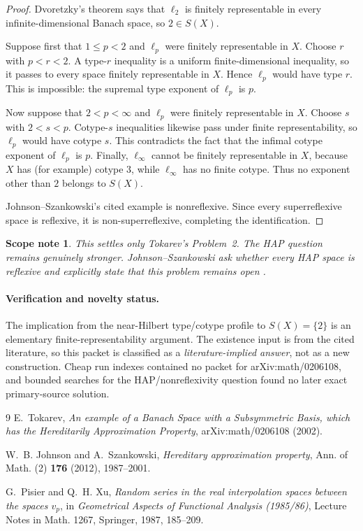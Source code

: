 \documentclass[11pt]{article}
\newtheorem{remark}{Scope note}
\begin{document}
\begin{proof}
Dvoretzky's theorem says that $\ell_2$ is finitely representable in every
infinite-dimensional Banach space, so $2\in S(X)$.

Suppose first that $1\le p<2$ and $\ell_p$ were finitely representable in
$X$.  Choose $r$ with $p<r<2$.  A type-$r$ inequality is a uniform
finite-dimensional inequality, so it passes to every space finitely
representable in $X$.  Hence $\ell_p$ would have type $r$.  This is
impossible: the supremal type exponent of $\ell_p$ is $p$.

Now suppose that $2<p<\infty$ and $\ell_p$ were finitely representable in
$X$.  Choose $s$ with $2<s<p$.  Cotype-$s$ inequalities likewise pass under
finite representability, so $\ell_p$ would have cotype $s$.  This contradicts
the fact that the infimal cotype exponent of $\ell_p$ is $p$.  Finally,
$\ell_\infty$ cannot be finitely representable in $X$, because $X$ has (for
example) cotype $3$, while $\ell_\infty$ has no finite cotype.  Thus no
exponent other than $2$ belongs to $S(X)$.

Johnson--Szankowski's cited example is nonreflexive.  Since every
superreflexive space is reflexive, it is non-superreflexive, completing the
identification.
\end{proof}

\begin{remark}
This settles only Tokarev's Problem~2.  The HAP question remains genuinely
stronger.  Johnson--Szankowski ask whether every HAP space is reflexive and
explicitly state that this problem remains open \cite[p.~1988]{JS}.
\end{remark}

\paragraph{Verification and novelty status.}
The implication from the near-Hilbert type/cotype profile to $S(X)=\{2\}$ is
an elementary finite-representability argument.  The existence input is from
the cited literature, so this packet is classified as a
\emph{literature-implied answer}, not as a new construction.  Cheap run
indexes contained no packet for arXiv:math/0206108, and bounded searches for
the HAP/nonreflexivity question found no later exact primary-source solution.

\begin{thebibliography}{9}
E.~Tokarev,
\emph{An example of a Banach Space with a Subsymmetric Basis, which has the
Hereditarily Approximation Property}, arXiv:math/0206108 (2002).

W.~B. Johnson and A.~Szankowski,
\emph{Hereditary approximation property},
Ann. of Math. (2) \textbf{176} (2012), 1987--2001.

G.~Pisier and Q.~H. Xu,
\emph{Random series in the real interpolation spaces between the spaces
$v_p$}, in \emph{Geometrical Aspects of Functional Analysis (1985/86)},
Lecture Notes in Math. 1267, Springer, 1987, 185--209.
\end{thebibliography}
\end{document}
